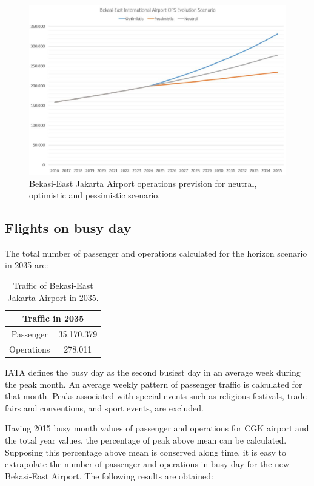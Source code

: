 \begin{figure}[H]
	\centering
	\includegraphics[clip, trim=0cm 0cm 0cm 0cm, width=1\textwidth]{./images/PROGNOSIS/TrafficForecast/BE_OPS_Prev_NEUOPTPES}
	\caption{Bekasi-East Jakarta Airport operations prevision for neutral, optimistic and pessimistic scenario.}
	\label{BE_OPS_Prev_NEUOPTPES}
\end{figure}
	
	\subsection{Flights on busy day}
The total number of passenger and operations calculated for the horizon scenario in 2035 are:

\begin{table}[H]
	\label{table:'Traffic2035'}
	\centering
\begin{tabular}{|c|c|}
	\hline 
	\multicolumn{2}{|c|}{\textbf{Traffic in 2035}}\tabularnewline
	\hline  
	Passenger & 35.170.379 \tabularnewline
	\hline 
	Operations & 278.011 \tabularnewline
	\hline 
\end{tabular}
	\caption{Traffic of Bekasi-East Jakarta Airport in 2035.}
\end{table}

IATA defines the busy day as the second busiest day in an average week during the peak month. An average weekly pattern of passenger traffic is calculated for that month. Peaks associated with special events such as religious festivals, trade fairs and conventions, and sport events, are excluded.

Having 2015 busy month values of passenger and operations for CGK airport and the total year values, the percentage of peak above mean can be calculated. Supposing this percentage above mean is conserved along time, it is easy to extrapolate the number of passenger and operations in busy day for the new Bekasi-East Airport. The following results are obtained:

